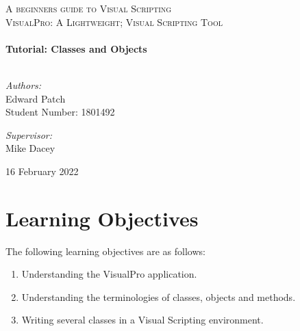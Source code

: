 \documentclass[10pt]{article}
\begin{document}
\begin{center}
\textsc{\LARGE A beginners guide to Visual Scripting}\\[1.5cm]													%

\textsc{\Large VisualPro: A Lightweight; Visual Scripting Tool}\\[0.5cm]

 			\vspace*{1cm}																		%
\HRule \\[0.4cm]																	%
{ \huge \bfseries Tutorial: Classes and Objects}\\[0.4cm]	%
\HRule \\[1.5cm]																	%
\begin{minipage}{0.4\textwidth}													%
\begin{flushleft} \large															
\textit{Authors:}\\
Edward Patch\\
Student Number: 1801492\\
\end{flushleft}																		%
\end{minipage}		
\begin{minipage}{0.5\textwidth}		
\vspace{-0.6cm}											%
\begin{flushright} \large															%
\textit{Supervisor:} \\
Mike Dacey														%
\end{flushright}																	%
\end{minipage}	
\vspace*{1cm}

\vspace{2cm} 																				
\begin{center}																					
{\large 16 February 2022}																	%
 			\end{center}												  						
\end{center}							 							
\newpage									

\tableofcontents
\thispagestyle{fancy}

\newpage
\section{Learning Objectives}
The following learning objectives are as follows:
\begin{enumerate}
    \item Understanding the VisualPro application.
    \item Understanding the terminologies of classes, objects and methods.
    \item Writing several classes in a Visual Scripting environment.
\end{enumerate}
\end{document}

